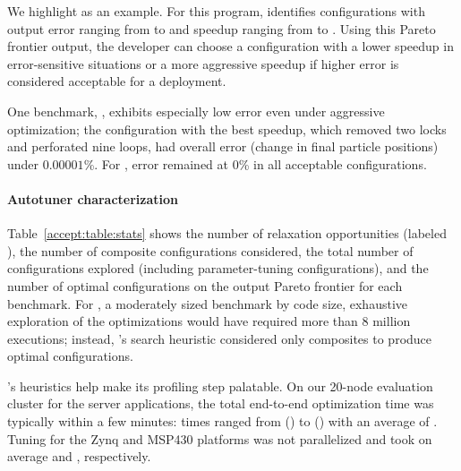 We highlight  as an example.
For this program, \sysname identifies 
configurations with output error ranging from  to
 and speedup ranging from
 to .
Using this Pareto frontier output, the developer can choose a
configuration with a lower speedup in error-sensitive situations or a
more aggressive  speedup if higher
error is considered acceptable for a
deployment.

One benchmark, , exhibits especially low error even under
aggressive optimization;
the configuration with the best speedup,
which removed two locks and perforated nine loops, had
overall error (change in final particle positions) under $0.00001$\%.  For
, error remained at $0$\% in all acceptable
configurations.

\paragraph{Autotuner characterization}

Table~\ref{accept:table:stats} shows
the number of relaxation opportunities (labeled ), the number of
composite configurations considered, the total number of configurations
explored (including parameter-tuning configurations),
and the number of optimal configurations on the output Pareto frontier
for each benchmark.
For , a moderately sized benchmark by code size,
exhaustive exploration of the 
optimizations would
have required more than 8 million executions;
instead, \sysname's search heuristic considered only
 composites
to produce  optimal configurations.

\sysname's heuristics help make its profiling step palatable.
On our 20-node evaluation cluster for the server applications, the total end-to-end optimization time was
typically within a few minutes: times ranged from 
() to 
() with an
average of .
Tuning for the Zynq and MSP430 platforms was not parallelized and took
 on average and
, respectively.


